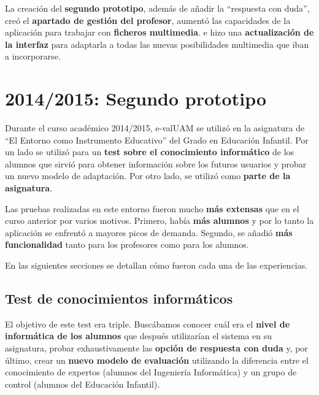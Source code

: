 La creación del \textbf{segundo prototipo}, además de añadir la ``respuesta con duda'', creó el \textbf{apartado de gestión del profesor}, aumentó las capacidades de la aplicación para trabajar con \textbf{ficheros multimedia}. e hizo una \textbf{actualización de la interfaz} para adaptarla a todas las nuevas posibilidades multimedia que iban a incorporarse.

\section{2014/2015: Segundo prototipo}

Durante el curso académico 2014/2015, \acrshort{e-valUAM} se utilizó en la asignatura de ``El Entorno como Instrumento Educativo'' del Grado en Educación Infantil. Por un lado se utilizó para un \textbf{test sobre el conocimiento informático} de los alumnos que sirvió para obtener información sobre los futuros usuarios y probar un nuevo modelo de adaptación. Por otro lado, se utilizó como \textbf{ parte de la asignatura}.

Las pruebas realizadas en este entorno fueron mucho \textbf{más extensas} que en el curso anterior por varios motivos. Primero, había \textbf{más alumnos} y por lo tanto la aplicación se enfrentó a mayores picos de demanda. Segundo, se añadió \textbf{más funcionalidad} tanto para los profesores como para los alumnos.

En las siguientes secciones se detallan cómo fueron cada una de las experiencias.

\subsection{Test de conocimientos informáticos}

El objetivo de este test era triple. Buscábamos conocer cuál era el\textbf{ nivel de informática de los alumnos} que después utilizarían el sistema en su asignatura, probar exhaustivamente las \textbf{opción de respuesta con duda} y, por último, crear un \textbf{nuevo modelo de evaluación} utilizando la diferencia entre el conocimiento de expertos (alumnos del Ingeniería Informática) y un grupo de control (alumnos del Educación Infantil).

